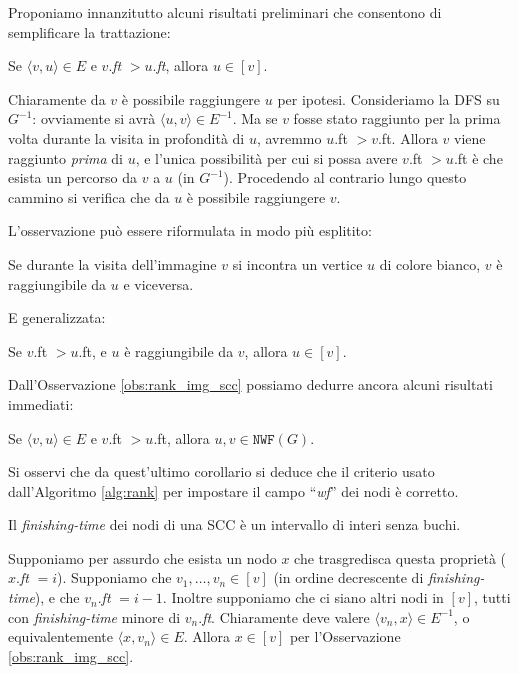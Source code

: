 Proponiamo innanzitutto alcuni risultati preliminari che consentono di semplificare la trattazione:
\begin{observation}
    \label{obs:rank_img_scc}
    Se $\langle v,u\rangle \in E$ e $v$.\emph{ft} $> u$.\emph{ft}, allora $u \in [v]$.
\end{observation}
\begin{proof2}
    Chiaramente da $v$ è possibile raggiungere $u$ per ipotesi. Consideriamo la DFS su $G^{-1}$: ovviamente si avrà $\langle u, v\rangle \in E^{-1}$. Ma se $v$ fosse stato raggiunto per la prima volta durante la visita in profondità di $u$, avremmo $u$.ft $> v$.ft. Allora $v$ viene raggiunto \emph{prima} di $u$, e l'unica possibilità per cui si possa avere $v$.ft $> u$.ft è che esista un percorso da $v$ a $u$ (in $G^{-1}$). Procedendo al contrario lungo questo cammino si verifica che da $u$ è possibile raggiungere $v$.
\end{proof2}

L'osservazione può essere riformulata in modo più esplitito:
\begin{corollary}
    Se durante la visita dell'immagine $v$ si incontra un vertice $u$ di colore bianco, $v$ è raggiungibile da $u$ e viceversa.
\end{corollary}

E generalizzata:
\begin{corollary}
    \label{cor:scc_minore_inglobamento}
    Se $v$.ft $> u$.ft, e $u$ è raggiungibile da $v$, allora $u \in [v]$.
\end{corollary}

Dall'Osservazione \ref{obs:rank_img_scc} possiamo dedurre ancora alcuni risultati immediati:
\begin{corollary}
    Se $\langle v,u\rangle \in E$ e $v$.ft $> u$.ft, allora $u,v \in \texttt{NWF}(G)$.
\end{corollary}

Si osservi che da quest'ultimo corollario si deduce che il criterio usato dall'Algoritmo \ref{alg:rank} per impostare il campo ``\emph{wf}'' dei nodi è corretto.
\begin{corollary}
    \label{cor:no_buchi_scc}
    Il \emph{finishing-time} dei nodi di una SCC è un intervallo di interi senza buchi.
\end{corollary}
\begin{proof2}
    Supponiamo per assurdo che esista un nodo $x$ che trasgredisca questa proprietà ($x$.\emph{ft} $= i$). Supponiamo che $v_1, \dots, v_n \in [v]$ (in ordine decrescente di \emph{finishing-time}), e che $v_n$.\emph{ft} $= i-1$. Inoltre supponiamo che ci siano altri nodi in $[v]$, tutti con \emph{finishing-time} minore di $v_n$.\emph{ft}. Chiaramente deve valere $\langle v_n,x \rangle \in E^{-1}$, o equivalentemente $\langle x,v_n \rangle \in E$. Allora $x \in [v]$ per l'Osservazione \ref{obs:rank_img_scc}.
\end{proof2}

